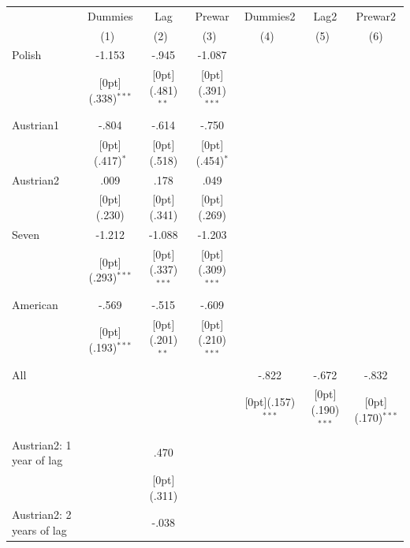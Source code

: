 \documentclass[12pt,a4paper,titlepage]{article}
\begin{document}
{\newpage
{}
\begin{tabular*}{\textwidth}{@{\extracolsep{\fill}}lcccccc}						
	& \multicolumn{1}{c}{Dummies} &	\multicolumn{1}{c}{Lag} &	\multicolumn{1}{c}{Prewar} &	\multicolumn{1}{c}{Dummies2} &	\multicolumn{1}{c}{Lag2} &	\multicolumn{1}{c}{Prewar2} \\
\cline{2-7}						
	& \multicolumn{1}{c}{(1)\mbox{\ }} &	\multicolumn{1}{c}{(2)\mbox{\ }} &	\multicolumn{1}{c}{(3)\mbox{\ }} &	\multicolumn{1}{c}{(4)\mbox{\ }} &	\multicolumn{1}{c}{(5)\mbox{\ }} &	\multicolumn{1}{c}{(6)} \\
\hline						
Polish &	-1.153 &	-.945 &	-1.087 &	&	&	\\
&	\raisebox{.7ex}[0pt]{\scriptsize (.338)$^{***}$} &	\raisebox{.7ex}[0pt]{\scriptsize (.481)$^{**}$} &	\raisebox{.7ex}[0pt]{\scriptsize (.391)$^{***}$} &	&	&	\\
Austrian1 &	-.804 &	-.614 &	-.750 &	&	&	\\
&	\raisebox{.7ex}[0pt]{\scriptsize (.417)$^{*}$} &	\raisebox{.7ex}[0pt]{\scriptsize (.518)} &	\raisebox{.7ex}[0pt]{\scriptsize (.454)$^{*}$} &	&	&	\\
Austrian2 &	.009 &	.178 &	.049 &	&	&	\\
&	\raisebox{.7ex}[0pt]{\scriptsize (.230)} &	\raisebox{.7ex}[0pt]{\scriptsize (.341)} &	\raisebox{.7ex}[0pt]{\scriptsize (.269)} &	&	&	\\
Seven &	-1.212 &	-1.088 &	-1.203 &	&	&	\\
&	\raisebox{.7ex}[0pt]{\scriptsize (.293)$^{***}$} &	\raisebox{.7ex}[0pt]{\scriptsize (.337)$^{***}$} &	\raisebox{.7ex}[0pt]{\scriptsize (.309)$^{***}$} &	&	&	\\
American &	-.569 &	-.515 &	-.609 &	&	&	\\
&	\raisebox{.7ex}[0pt]{\scriptsize (.193)$^{***}$} &	\raisebox{.7ex}[0pt]{\scriptsize (.201)$^{**}$} &	\raisebox{.7ex}[0pt]{\scriptsize (.210)$^{***}$} &	&	&	\\
All &	&	&	&	-.822 &	-.672 &	-.832 \\
&	&	&	&	\raisebox{.7ex}[0pt]{\scriptsize (.157)$^{***}$} &	\raisebox{.7ex}[0pt]{\scriptsize (.190)$^{***}$} &	\raisebox{.7ex}[0pt]{\scriptsize (.170)$^{***}$} \\
Austrian2: 1 year of lag &	&	.470 &	&	&	&	\\
&	&	\raisebox{.7ex}[0pt]{\scriptsize (.311)} &	&	&	&	\\
Austrian2: 2 years of lag &	&	-.038 &	&	&	&	\\

\end{tabular*}}
\end{document}
